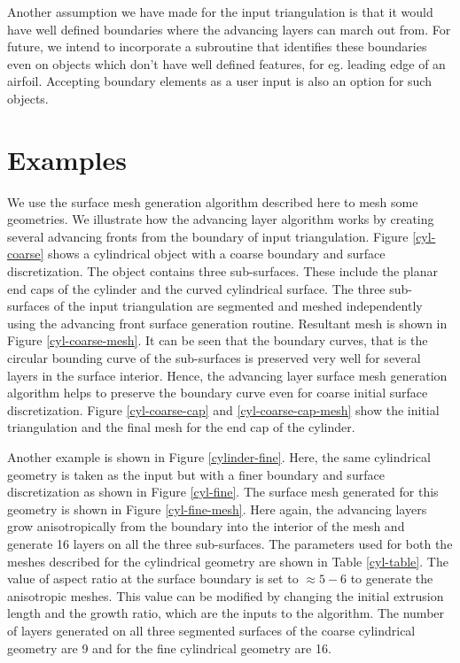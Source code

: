 \documentclass[conf]{new-aiaa}
\begin{document}
Another assumption we have made for the input triangulation is that it would have well defined boundaries where the advancing layers can march out from. For future, we intend to incorporate a subroutine that identifies these boundaries even on objects which don't have well defined features, for eg. leading edge of an airfoil. Accepting boundary elements as a user input is also an option for such objects.

\section{Examples}

We use the surface mesh generation algorithm described here to mesh some geometries. We illustrate how the advancing layer algorithm works by creating several advancing fronts from the boundary of input triangulation. Figure \ref{cyl-coarse} shows a cylindrical object with a coarse boundary and surface discretization. The object contains three sub-surfaces. These include the planar end caps of the cylinder and the curved cylindrical surface. The three sub-surfaces of the input triangulation are segmented and meshed  independently using the advancing front surface generation routine. Resultant mesh is shown in Figure \ref{cyl-coarse-mesh}. It can be seen that the boundary curves, that is the circular bounding curve of the sub-surfaces is preserved very well for several layers in the surface interior. Hence, the advancing layer surface mesh generation algorithm helps to preserve the boundary curve even for coarse initial surface discretization. Figure \ref{cyl-coarse-cap} and \ref{cyl-coarse-cap-mesh} show the initial triangulation and the final mesh for the end cap of the cylinder. 

Another example is shown in Figure \ref{cylinder-fine}. Here, the same cylindrical geometry is taken as the input but with a finer boundary and surface discretization as shown in Figure \ref{cyl-fine}. The surface mesh generated for this geometry is shown in Figure \ref{cyl-fine-mesh}. Here again, the advancing layers grow anisotropically from the boundary into the interior of the mesh and generate 16 layers on all the three sub-surfaces. The parameters used for both the meshes described for the cylindrical geometry are shown in Table \ref{cyl-table}. The value of aspect ratio at the surface boundary is set to $\approx 5-6$ to generate the anisotropic meshes. This value can be modified by changing the initial extrusion length and the growth ratio, which are the inputs to the algorithm. The number of layers generated on all three segmented surfaces of the coarse cylindrical geometry are 9 and for the fine cylindrical geometry are 16.
\end{document}
